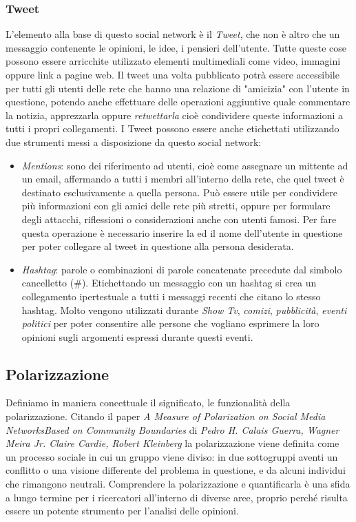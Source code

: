 \subsubsection{Tweet}
L'elemento alla base di questo social network è il \textit{Tweet}, che non è altro che un messaggio contenente le opinioni, le idee, i pensieri dell'utente. Tutte queste cose possono essere arricchite utilizzato elementi multimediali come video, immagini oppure link a pagine web. Il tweet una volta pubblicato potrà essere accessibile per tutti gli utenti delle rete che hanno una relazione di "amicizia" con l'utente in questione, potendo anche effettuare delle operazioni aggiuntive quale commentare la notizia, apprezzarla oppure \textit{retwettarla} cioè condividere queste informazioni a tutti i propri collegamenti.
I Tweet possono essere anche etichettati utilizzando due strumenti messi a disposizione da questo social network:
\begin{itemize}
\item \textit{Mentions}: sono dei riferimento ad utenti, cioè come assegnare un mittente ad un email, affermando a tutti i membri all'interno della rete, che quel tweet è destinato esclusivamente a quella persona. Può essere utile per condividere più informazioni con gli amici delle rete più stretti, oppure per formulare degli attacchi, riflessioni o considerazioni anche con utenti famosi. Per fare questa operazione è necessario inserire la \@ ed il nome dell'utente in questione per poter collegare al tweet in questione alla persona desiderata.
\item \textit{Hashtag}: parole o combinazioni di parole concatenate precedute dal simbolo cancelletto (\#).
Etichettando un messaggio con un hashtag si crea un collegamento ipertestuale a tutti i messaggi recenti che citano lo stesso hashtag. Molto  vengono utilizzati durante \textit{Show Tv}, \textit{comizi}, \textit{pubblicità}, \textit{eventi politici} per poter consentire alle persone che vogliano esprimere la loro opinioni sugli argomenti espressi durante questi eventi. 

\end{itemize}

\subsection{Polarizzazione}
Definiamo in maniera concettuale il significato, le funzionalità della polarizzazione. 
Citando il paper \textit{A Measure of Polarization on Social Media NetworksBased on Community Boundaries} di \textit{Pedro H. Calais Guerra, Wagner Meira Jr. Claire Cardie, Robert Kleinberg} la polarizzazione viene definita come un processo sociale in cui un gruppo viene diviso: 
in due sottogruppi aventi un conflitto o una visione differente del problema in questione, e da alcuni individui che rimangono neutrali.
Comprendere la polarizzazione e quantificarla è una sfida a lungo termine per i ricercatori all'interno di diverse aree, proprio perché risulta essere un potente strumento per l'analisi delle opinioni.

